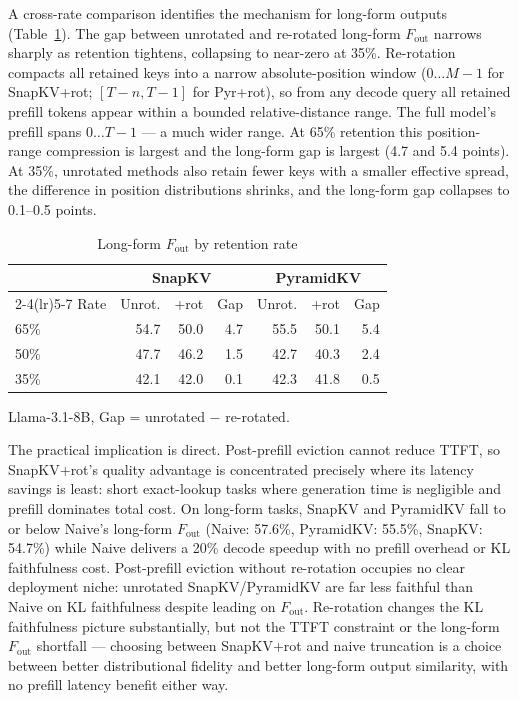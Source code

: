 \documentclass[10pt,letterpaper]{article}
\begin{document}
A cross-rate comparison identifies the mechanism for long-form outputs
(Table~\ref{tab:t7}). The gap between unrotated and re-rotated long-form
\(F_{\text{out}}\) narrows sharply as retention tightens, collapsing to
near-zero at 35\%. Re-rotation compacts all retained keys into a narrow
absolute-position window (\(0 \ldots M-1\) for SnapKV+rot;
\([T-n, T-1]\) for Pyr+rot), so from any decode query all retained
prefill tokens appear within a bounded relative-distance range. The full
model's prefill spans \(0 \ldots T-1\) --- a much wider range. At 65\%
retention this position-range compression is largest and the long-form
gap is largest (4.7 and 5.4 points). At 35\%, unrotated methods also
retain fewer keys with a smaller effective spread, the difference in
position distributions shrinks, and the long-form gap collapses to
0.1--0.5 points.
\begin{table}[H]
\centering
\small
\caption{Long-form \(F_{\text{out}}\) by retention rate}
\label{tab:t7}
\begin{tabular}{@{}lrrrrrr@{}}
\toprule
& \multicolumn{3}{c}{SnapKV} & \multicolumn{3}{c}{PyramidKV}\\
\cmidrule(lr){2-4}\cmidrule(lr){5-7}
Rate & Unrot. & +rot & Gap & Unrot. & +rot & Gap\\
\midrule
65\% & 54.7 & 50.0 & 4.7 & 55.5 & 50.1 & 5.4\\
50\% & 47.7 & 46.2 & 1.5 & 42.7 & 40.3 & 2.4\\
35\% & 42.1 & 42.0 & 0.1 & 42.3 & 41.8 & 0.5\\
\bottomrule
\end{tabular}
\center
Llama-3.1-8B, Gap = unrotated − re-rotated.
\end{table}


The practical implication is direct. Post-prefill eviction cannot reduce
TTFT, so SnapKV+rot's quality advantage is concentrated precisely where
its latency savings is least: short exact-lookup tasks where generation
time is negligible and prefill dominates total cost. On long-form tasks,
SnapKV and PyramidKV fall to or below Naive's long-form \(F_{\text{out}}\)
(Naive: 57.6\%, PyramidKV: 55.5\%, SnapKV: 54.7\%) while Naive delivers a 20\%
decode speedup with no prefill overhead or KL faithfulness cost.
Post-prefill eviction without re-rotation occupies no clear deployment
niche: unrotated SnapKV/PyramidKV are far less faithful than Naive on KL
faithfulness despite leading on \(F_{\text{out}}\). Re-rotation changes
the KL faithfulness picture substantially, but not the TTFT constraint
or the long-form \(F_{\text{out}}\) shortfall --- choosing between
SnapKV+rot and naive truncation is a choice between better
distributional fidelity and better long-form output similarity, with no
prefill latency benefit either way.
\end{document}

